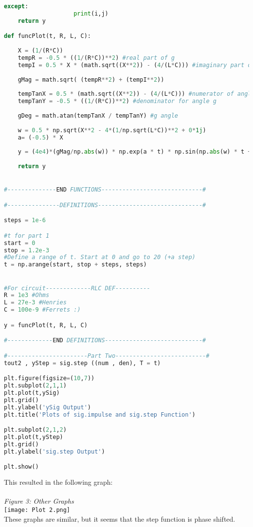 \documentclass[12pt,a4paper]{article}
\begin{document}
\begin{lstlisting}[language=Python]
                except:
                    print(i,j)
    return y

def funcPlot(t, R, L, C):
    
    X = (1/(R*C))
    tempR = -0.5 * ((1/(R*C))**2) #real part of g
    tempI = 0.5 * X * (math.sqrt((X**2)) - (4/(L*C))) #imaginary part of g
    
    gMag = math.sqrt( (tempR**2) + (tempI**2)) 
    
    tempTanX = 0.5 * (math.sqrt((X**2)) - (4/(L*C))) #numerator of angle g
    tempTanY = -0.5 * ((1/(R*C))**2) #denominator for angle g
    
    gDeg = math.atan(tempTanX / tempTanY) #g angle
    
    w = 0.5 * np.sqrt(X**2 - 4*(1/np.sqrt(L*C))**2 + 0*1j)
    a= (-0.5) * X
    
    y = (4e4)*(gMag/np.abs(w)) * np.exp(a * t) * np.sin(np.abs(w) * t + gDeg) * stepFunc(t, 0, 1)
    
    return y


#--------------END FUNCTIONS-----------------------------#

#---------------DEFINITIONS------------------------------#

steps = 1e-6

#t for part 1
start = 0
stop = 1.2e-3
#Define a range of t. Start at 0 and go to 20 (+a step)
t = np.arange(start, stop + steps, steps)


#For circuit-------------RLC DEF----------
R = 1e3 #Ohms
L = 27e-3 #Henries
C = 100e-9 #Ferrets :)

y = funcPlot(t, R, L, C)

#-------------END DEFINITIONS----------------------------#

#-----------------------Part Two--------------------------#
tout2 , yStep = sig.step ((num , den), T = t)

plt.figure(figsize=(10,7))
plt.subplot(2,1,1)
plt.plot(t,ySig)
plt.grid()
plt.ylabel('ySig Output')
plt.title('Plots of sig.impulse and sig.step Function')

plt.subplot(2,1,2)
plt.plot(t,yStep)
plt.grid()
plt.ylabel('sig.step Output')

plt.show()
\end{lstlisting}
This resulted in the following graph:\\
\\
\textit{Figure 3: Other Graphs}
\\
\texttt{[image: Plot 2.png]}
\\
These graphs are similar, but it seems that the step function is phase shifted.
\end{document}
